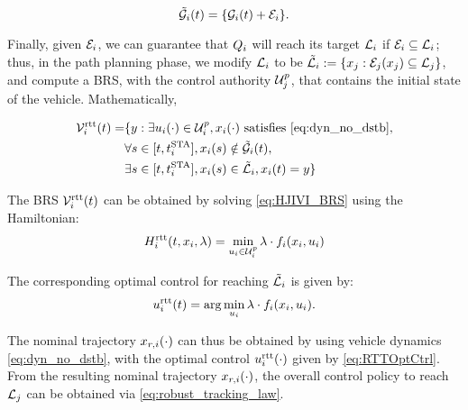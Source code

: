 \begin{equation} 
\label{eqn:rttAugObs}
\tilde{\obsset}_i(t) = \{\obsset_i(t) + \errorbound_i\}.
\end{equation}

Finally, given $\mathcal{E}_i$, we can guarantee that $Q_i$ will reach its target $\mathcal{L}_i$ if $\mathcal{E}_i \subseteq \mathcal{L}_i$; thus, in the path planning phase, we modify $\mathcal{L}_i$ to be $\tilde{\mathcal{L}}_i := \{x_j: \mathcal{E}_j(x_j) \subseteq \mathcal{L}_j\}$, and compute a BRS, with the control authority $\mathcal{U}^p_j$, that contains the initial state of the vehicle. Mathematically,

\begin{equation}
\label{eq:rttBRS}
\begin{aligned}
\brs_i^\text{rtt}(t) = & \{y: \exists \ctrl_i(\cdot) \in \cset^\pos_i, \state_i(\cdot) \text{ satisfies \eqref{eq:dyn_no_dstb}},\\
&\forall s \in [t, \sta_i], \state_i(s) \notin \tilde{\obsset}_i(t), \\
& \exists s \in [t, \sta_i], \state_i(s) \in \tilde{\targetset}_i, \state_i(t) = y\}
\end{aligned}
\end{equation}

The BRS $\mathcal{V}_i^\text{rtt}(t)$ can be obtained by solving \eqref{eq:HJIVI_BRS} using the Hamiltonian: 
\begin{equation}
\label{eq:RTTham}
\ham_i^\text{rtt}(t, \state_i, \costate) = \min_{\ctrl_i \in \cset^\pos_i } \costate \cdot \fdyn_i(\state_i, \ctrl_i)
\end{equation}

The corresponding optimal control for reaching $\tilde{\mathcal{L}}_i$ is given by:
\begin{equation}
\label{eq:RTTOptCtrl}
\ctrl_i^\text{rtt}(t) = \arg \min_{\ctrl_i} \costate \cdot \fdyn_i(\state_i, \ctrl_i).
\end{equation}

The nominal trajectory $x_{r,i}(\cdot)$ can thus be obtained by using vehicle dynamics \eqref{eq:dyn_no_dstb}, with the optimal control  $u_i^\text{rtt}(\cdot)$ given by \eqref{eq:RTTOptCtrl}. From the resulting nominal trajectory $x_{r,i}(\cdot)$, the overall control policy to reach $\mathcal{L}_j$ can be obtained via \eqref{eq:robust_tracking_law}.

